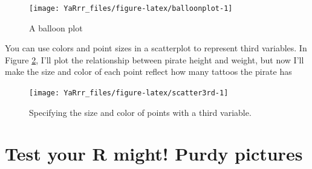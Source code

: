 \documentclass[]{book}
\newenvironment{Shaded}{\begin{snugshade}}{\end{snugshade}}
\newcommand{\KeywordTok}[1]{\textcolor[rgb]{0.13,0.29,0.53}{\textbf{#1}}}
\newcommand{\DataTypeTok}[1]{\textcolor[rgb]{0.13,0.29,0.53}{#1}}
\newcommand{\DecValTok}[1]{\textcolor[rgb]{0.00,0.00,0.81}{#1}}
\newcommand{\StringTok}[1]{\textcolor[rgb]{0.31,0.60,0.02}{#1}}
\newcommand{\CommentTok}[1]{\textcolor[rgb]{0.56,0.35,0.01}{\textit{#1}}}
\newcommand{\OperatorTok}[1]{\textcolor[rgb]{0.81,0.36,0.00}{\textbf{#1}}}
\newcommand{\NormalTok}[1]{#1}
\theoremstyle{definition}
\theoremstyle{definition}
\theoremstyle{remark}
\begin{document}
\begin{figure}

{\centering \texttt{[image: YaRrr\_files/figure-latex/balloonplot-1]} 

}

\caption{A balloon plot}\label{fig:balloonplot}
\end{figure}

You can use colors and point sizes in a scatterplot to represent third
variables. In Figure \ref{fig:scatter3rd}, I'll plot the relationship
between pirate height and weight, but now I'll make the size and color
of each point reflect how many tattoos the pirate has

\begin{Shaded}
\end{Shaded}

\begin{figure}

{\centering \texttt{[image: YaRrr\_files/figure-latex/scatter3rd-1]} 

}

\caption{Specifying the size and color of points with a third variable.}\label{fig:scatter3rd}
\end{figure}

\section{Test your R might! Purdy
pictures}\label{test-your-r-might-purdy-pictures}
\end{document}
